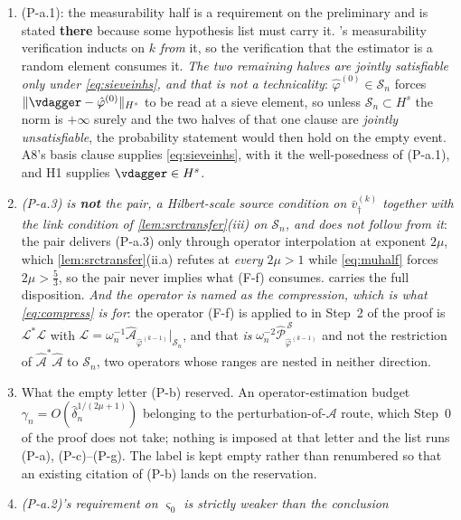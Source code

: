 \begin{remark}
\begin{enumerate}
records it as unused on the rate route, and item~(8) below prices what carrying it would have cost.
\item[(3)] \textup{(P-a.1)}: the measurability half is a requirement on the preliminary and is
stated \textbf{there} because some hypothesis list must carry it. 's measurability
verification inducts on $k$ \emph{from} it, so the verification that the estimator is a random element
consumes it. \emph{The two remaining halves are jointly satisfiable only under \eqref{eq:sieveinhs}, and
that is not a technicality}: $\hat\varphi^{(0)}\in\mathcal S_n$ forces
$\|\vdagger-\hat\varphi^{(0)}\|_{H^{s}}$ to be read at a sieve element, so unless
$\mathcal S_n\subset H^{s}$ the norm is $+\infty$ surely and the two halves of that one clause are
\emph{jointly unsatisfiable}, the probability statement would then hold on the empty event. A8's basis
clause supplies \eqref{eq:sieveinhs}, with it the well-posedness of (P-a.1), and H1 supplies
$\vdagger\in H^{s}$.
\item[(4)] \emph{\textup{(P-a.3)} is \textbf{not} the pair, a Hilbert-scale source condition on
$\bar v^{(k)}_\dagger$ together with the link condition of \cref{lem:srctransfer}(iii) on
$\mathcal S_n$, and does not follow from it}: the pair delivers (P-a.3) only through operator
interpolation at exponent $2\mu$, which \cref{lem:srctransfer}(ii.a) refutes at \emph{every} $2\mu>1$
while \eqref{eq:muhalf} forces $2\mu>\tfrac53$, so the pair never implies what (F-f) consumes.
 carries the full disposition. \emph{And the operator is named as the compression, which
is what \eqref{eq:compress} is for}: the operator (F-f) is applied to in Step~2 of the proof is
$\mathcal L^{\ast}\mathcal L$ with
$\mathcal L=\omega_n^{-1}\hat{\mathcal A}_{\hat\varphi^{(k-1)}}\vert_{\mathcal S_n}$, and that \emph{is}
$\omega_n^{-2}\hat{\mathcal P}^{\,\mathcal S}_{\hat\varphi^{(k-1)}}$ and not the restriction of
$\hat{\mathcal A}^{\ast}\hat{\mathcal A}$ to $\mathcal S_n$, two operators whose ranges are nested in
neither direction.
\item[(5)] What the empty letter \textup{(P-b)} reserved. An operator-estimation budget
$\gamma_n=O(\hat\delta_n^{1/(2\mu+1)})$ belonging to the perturbation-of-$\mathcal A$ route, which
Step~0 of the proof does not take; nothing is imposed at that letter and the list runs \textup{(P-a)},
\textup{(P-c)}--\textup{(P-g)}. The label is kept empty rather than renumbered so that an existing
citation of (P-b) lands on the reservation.
\item[(6)] \emph{\textup{(P-a.2)}'s requirement on $\varsigma_0$ is strictly weaker than the conclusion
}
\end{enumerate}
\end{remark}
